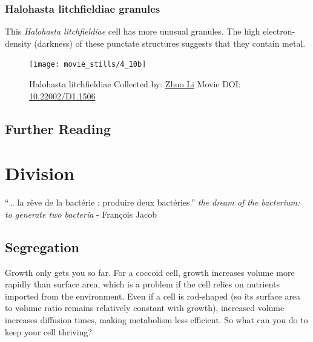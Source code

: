 \documentclass[]{tufte-book}
\begin{document}
\hypertarget{Halohasta_litchfieldiae_granules}{\subsection{Halohasta
litchfieldiae granules}\label{Halohasta_litchfieldiae_granules}}

This \emph{Halohasta litchfieldiae} cell has more unusual granules. The
high electron-density (darkness) of these punctate structures suggests
that they contain metal.





\begin{figure}
\texttt{[image: movie\_stills/4\_10b]} \caption[Halohasta litchfieldiae Collected by:
\protect\hyperlink{zhuo_li}{Zhuo Li} Movie DOI:
\href{https://doi.org/10.22002/D1.1506}{10.22002/D1.1506}]{Halohasta litchfieldiae Collected by:
\protect\hyperlink{zhuo_li}{Zhuo Li} Movie DOI:
\href{https://doi.org/10.22002/D1.1506}{10.22002/D1.1506}}\label{fig:4-10b}
\end{figure}

\section{Further Reading}\label{further-reading-3}

\citep{barry2011}

\citep{hoppert1999}

\citep{kerfeld2018}

\citep{oostergetel2010}

\chapter{Division}\label{division}

``\ldots{} la rêve de la bactérie : produire deux bactéries.'' \emph{the
dream of the bacterium: to generate two bacteria} - François Jacob
\citep{jacob2002a}

\section{Segregation}\label{segregation}

Growth only gets you so far. For a coccoid cell, growth increases volume
more rapidly than surface area, which is a problem if the cell relies on
nutrients imported from the environment. Even if a cell is rod-shaped
(so its surface area to volume ratio remains relatively constant with
growth), increased volume increases diffusion times, making metabolism
less efficient. So what can you do to keep your cell thriving?
\end{document}
